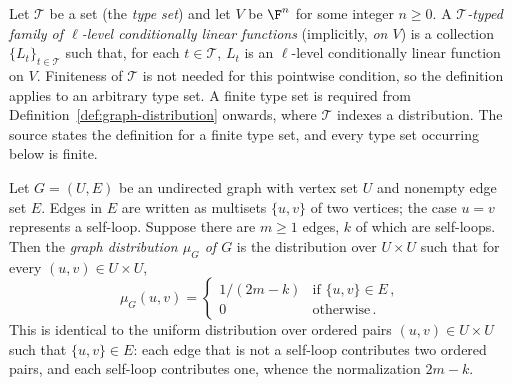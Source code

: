 \begin{definition}\label{def:typed-cl-functions}
	Let $\mathcal T$ be a set (the \emph{type set}) and let $V$ be $\F^n$ for some integer $n \ge 0$. A \emph{$\mathcal T$-typed family of $\ell$-level conditionally linear functions} (implicitly, \emph{on $V$}) is a collection $\{L_t\}_{t \in \mathcal T}$ such that, for each $t \in \mathcal T$, $L_t$ is an $\ell$-level conditionally linear function on $V$. Finiteness of $\mathcal T$ is not needed for this pointwise condition, so the definition applies to an arbitrary type set. A finite type set is required from Definition~\ref{def:graph-distribution} onwards, where $\mathcal T$ indexes a distribution. The source states the definition for a finite type set, and every type set occurring below is finite.
\end{definition}

\begin{definition}\label{def:graph-distribution}
	\leanok
	Let $G = (U, E)$ be an undirected graph with vertex set $U$ and nonempty edge set $E$. Edges in $E$ are written as multisets $\{u, v\}$ of two vertices; the case $u = v$ represents a self-loop. Suppose there are $m \ge 1$ edges, $k$ of which are self-loops. Then the \emph{graph distribution $\mu_G$ of $G$} is the distribution over $U \times U$ such that for every $(u,v) \in U \times U$,
	\[
		\mu_G(u, v) =
		\begin{cases}
			1/(2m-k) & \text{if } \{u,v\} \in E\,,\\
			0 & \text{otherwise}\,.
		\end{cases}
	\]
	This is identical to the uniform distribution over ordered pairs $(u,v) \in U \times U$ such that $\{u,v\} \in E$: each edge that is not a self-loop contributes two ordered pairs, and each self-loop contributes one, whence the normalization $2m-k$.
\end{definition}

